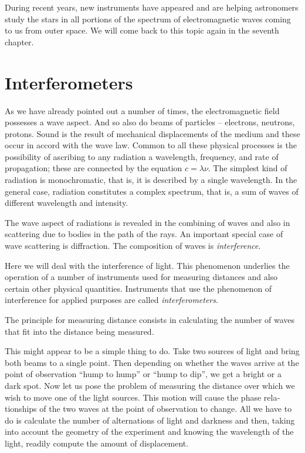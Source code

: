 During recent years, new instruments have appeared and are helping astronomers study the stars in all portions of the spectrum of electromagnetic waves coming to us from outer space. We will come back to this topic again in the seventh chapter.


\section{Interferometers}

As we have already pointed out a number of times, the electromagnetic field possesses a wave aspect. And so also do beams of particles -- electrons, neutrons, protons. Sound is the result of mechanical displacements of the medium and these occur in accord with the wave law. Common to all these physical processes is the possibility of ascribing to any radiation a wavelength, frequency, and rate of propagation; these are connected by the equa­tion $c = \lambda \nu$. The simplest kind of radiation is monochro­matic, that is, it is described by a single wavelength. In the general case, radiation constitutes a complex spectrum, that is, a sum of waves of different wavelength and intensity.

The wave aspect of radiations is revealed in the combin­ing of waves and also in scattering due to bodies in the path of the rays. An important special case of wave scattering is diffraction. The composition of waves is \emph{interference}.

Here we will deal with the interference of light. This phenomenon underlies the operation of a number of in­struments used for measuring distances and also certain other physical quantities. Instruments that use the phe­nomenon of interference for applied purposes are called \emph{interferometers}.

The principle for measuring distance consists in cal­culating the number of waves that fit into the distance being measured.

This might appear to be a simple thing to do. Take two sources of light and bring both beams to a single point. Then depending on whether the waves arrive at the point of observation ``hump to hump'' or ``hump to dip'', we get a bright or a dark spot. Now let us pose the problem of measuring the distance over which we wish to move one of the light sources. This motion will cause the phase rela­tionships of the two waves at the point of observation to change. All we have to do is calculate the number of alter­nations of light and darkness and then, taking into account the geometry of the experiment and knowing the wave­length of the light, readily compute the amount of dis­placement.

